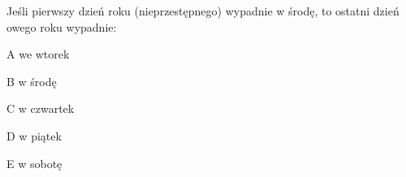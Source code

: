 \begin{tresc}
Jeśli pierwszy dzień roku (nieprzestępnego) wypadnie w środę, to ostatni dzień owego roku wypadnie:
\end{tresc}
\begin{wariant}{A} we wtorek \end{wariant}
\begin{wariant}{B} w środę \end{wariant}
\begin{wariant}{C} w czwartek \end{wariant}
\begin{wariant}{D} w piątek \end{wariant}
\begin{wariant}{E} w sobotę \end{wariant}
